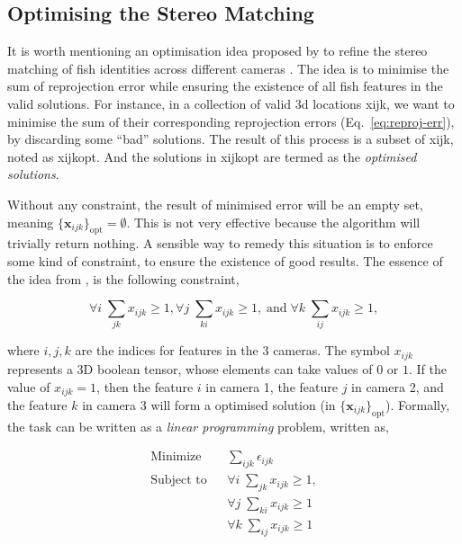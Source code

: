 \documentclass[11pt,twoside]{report}
\begin{document}
\subsection{Optimising the Stereo Matching}
\label{section:stereo-opt}

It is worth mentioning an optimisation idea proposed by \citeauthor{attanasi2015b} to refine the stereo matching of fish identities
across different cameras \cite{attanasi2015b}. The idea is to minimise the sum of reprojection error while ensuring the existence of all fish features in the valid solutions. 
For instance, in a collection of valid 3d locations \gls{xijk}, we want to minimise the sum of their corresponding reprojection errors (Eq.~\ref{eq:reproj-err}), by discarding some ``bad'' solutions. The result of this process is a subset of \gls{xijk}, noted as \gls{xijkopt}.
And the solutions in \gls{xijkopt} are termed as the \emph{optimised solutions}.

Without any constraint, the result of minimised error will be an empty set, meaning $\{ \mathbf{x}_{ijk} \}_\textrm{opt} = \emptyset$. This is not very effective because the algorithm will trivially return nothing. A sensible way to remedy this situation is to enforce some kind of constraint, to ensure the existence of good results. The essence of the idea from \citeauthor{attanasi2015b}, is the following constraint,

$$
\forall i \; \sum_{j k} x_{i j k} \geq 1,
\forall j \; \sum_{k i} x_{i j k} \geq 1,\;\textrm{and}\;
\forall k \; \sum_{i j} x_{i j k} \geq 1,
$$

\noindent where $i, j, k$ are the indices for features in the 3 cameras. The symbol $x_{ijk}$ represents a 3D boolean tensor, whose elements can take values of $0$ or $1$. If the value of $x_{ijk} = 1$, then the feature $i$ in camera 1, the feature $j$ in camera 2, and the feature $k$ in camera 3 will form a optimised solution (in $\{ \mathbf{x}_{ijk} \}_\textrm{opt}$). Formally, the task can be written as a \emph{linear programming} problem, written as,

\begin{equation}
\begin{aligned}
	\textrm{Minimize} 
	&& \sum_{ijk}{\epsilon_{ijk}} \\
	\textrm{Subject to}
	&& \forall i \; \sum_{j k} x_{i j k} \geq 1, \\
	&& \forall j \; \sum_{k i} x_{i j k} \geq 1 \\
	&& \forall k \; \sum_{i j} x_{i j k} \geq 1
\end{aligned}
\label{eq:stereo-opt}
\end{equation}
\end{document}
